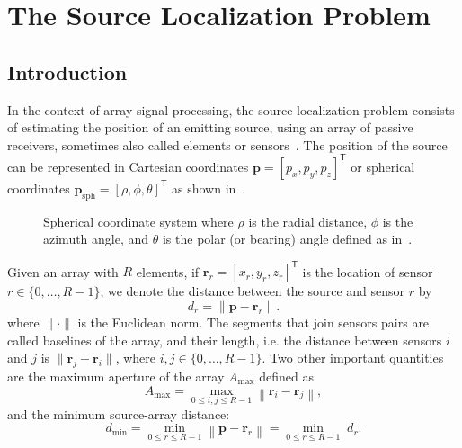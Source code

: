 \chapter{The Source Localization Problem}\label{ch:sourcelocalization}

\section{Introduction}\label{sec:introduction}

In the context of array signal processing, the source localization problem consists of estimating the position of an emitting source, using an array of passive receivers, sometimes also called elements or sensors~\cite{benesty2008microphone}. The position of the source can be represented in Cartesian coordinates \(\mathbf{p}=[p_x,p_y,p_z]^\mathsf{T}\) or spherical coordinates \(\mathbf{p}_{\text{sph}}=[\rho,\phi,\theta]^\mathsf{T}\) as shown in~.

\begin{figure}[!b]
\centering
\resizebox{0.4\linewidth}{!}{}
\caption[]{Spherical coordinate system where \(\rho\) is the radial distance, \(\phi\) is the azimuth angle, and \(\theta\) is the polar (or bearing) angle defined as in~\cite{van2002optimum}.}
\label{fig:coordinatex}
\end{figure}

\noindent
Given an array with \(R\) elements, if \(\mathbf{r}_r=[x_{r},y_{r},z_{r}]^\mathsf{T}\) is the location of sensor \(r\in\{0,\ldots,R-1\}\),
we denote the distance between the source and sensor \(r\) by 
\begin{equation}
d_r=\|\mathbf{p}-\mathbf{r}_r\|.
\label{eq:laprima}
\end{equation}
where \(\|\cdot\|\) is the Euclidean norm. 
The segments that join sensors pairs are called baselines of the array, and their length, i.e. the distance between sensors \(i\) and \(j\) is \(\|\mathbf{r}_j-\mathbf{r}_i\|\), where \(i,j\in\{0,\ldots,R-1\}\).
Two other important quantities are the maximum aperture of the array \(A_{\text{max}}\) defined as
\begin{equation}
A_{\text{max}}
= \underset{0\leq i,j\leq R-1}{\max} \left\|\mathbf{r}_i-\mathbf{r}_j\right\|,
\label{eq:a}
\end{equation}
and the minimum source-array distance:
\begin{equation}
d_{\text{min}} 
= \underset{0\leq r\leq R-1}{\min} \left\|\mathbf{p}-\mathbf{r}_r\right\|
= \underset{0\leq r\leq R-1}{\min} \; d_r.
\end{equation}

